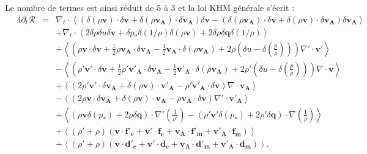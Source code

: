 Le nombre de termes est ainsi réduit de 5 à 3 et la loi \acs{KHM} générale s'écrit : 
\begin{equation}
\boxed{
\begin{array}{lcl}
\label{eq:turb_cpi_khm3}\quad 4\partial_t \mathcal{R} &=& \nabla_{\boldsymbol{\ell}} \cdot \left<\left(\delta \left(\rho\boldsymbol{v}\right) \cdot \delta \boldsymbol{v}+ \delta \left(\rho\boldsymbol{v_A}\right) \cdot \delta \boldsymbol{v_A}\right) \delta \boldsymbol{v}  -\left(\delta \left(\rho\boldsymbol{v_A}\right) \cdot \delta \boldsymbol{v}  + \delta \left(\rho\boldsymbol{v}\right) \cdot \delta \boldsymbol{v_A}  \right) \delta \boldsymbol{v_A} \right>\\
&& + \nabla_{\boldsymbol{\ell}} \cdot \left<2 \delta \rho \delta u \delta \boldsymbol{v}+ \delta p_*  \delta \left(1/\rho\right) \delta\left(\rho \boldsymbol{v}\right) + 2\delta \rho \delta \boldsymbol{q}\delta \left(1/\rho\right) \right> \\
&& +\left< \left(\rho \boldsymbol{v} \cdot \delta \boldsymbol{v} +\frac{1}{2} \rho \boldsymbol{v_A} \cdot \delta \boldsymbol{v_A} -\frac{1}{2} \boldsymbol{v_A} \cdot \delta \left(\rho \boldsymbol{v_A}\right) + 2\rho \left(\delta u - \delta \left(\frac{p}{\rho}\right)\right) \right) \nabla' \cdot \boldsymbol{v'} \right>\\
&& -\left<\left( \rho' \boldsymbol{v'} \cdot \delta \boldsymbol{v} +\frac{1}{2} \rho' \boldsymbol{v'_A} \cdot \delta \boldsymbol{v_A} -\frac{1}{2} \boldsymbol{v'_A} \cdot \delta \left(\rho \boldsymbol{v_A}\right) + 2\rho' \left(\delta u - \delta \left(\frac{p}{\rho}\right)\right)  \right)\nabla \cdot \boldsymbol{v}\right>\\
&&+ \left<\left(2 \rho' \boldsymbol{v'} \cdot \delta \boldsymbol{v_A}+ \delta\left(\rho \boldsymbol{v}\right) \cdot \boldsymbol{v'_A} - \rho' \boldsymbol{v'_A} \cdot \delta \boldsymbol{v}  \right)\nabla \cdot \boldsymbol{v_A}\right>\\
&&- \left<\left(2\rho \boldsymbol{v} \cdot \delta \boldsymbol{v_A} + \delta\left(\rho \boldsymbol{v}\right) \cdot \boldsymbol{v_A} - \rho \boldsymbol{v_A} \cdot \delta \boldsymbol{v}  \right)\nabla' \cdot \boldsymbol{v'_A}\right> \\
&&+ \left< \left(\rho\boldsymbol{v} \delta \left(p_*\right)  + 2 \rho \delta \boldsymbol{q}\right) \cdot \nabla'\left(\frac{1}{\rho'}\right) - \left(\rho' \boldsymbol{v'}\delta \left(p_*\right) + 2\rho' \delta \boldsymbol{q} \right) \cdot \nabla \left(\frac{1}{\rho}\right)\right>\\
&&+  \left<\left(\rho' + \rho\right)\left(\boldsymbol{v} \cdot \boldsymbol{f'_c} + \boldsymbol{v'} \cdot \boldsymbol{f_c} + \boldsymbol{v_A} \cdot \boldsymbol{f'_m} + \boldsymbol{v'_A} \cdot \boldsymbol{f_m}\right) \right>\\
&&+ \left<\left(\rho' + \rho\right)\left(\boldsymbol{v} \cdot \boldsymbol{d'_c} + \boldsymbol{v'} \cdot \boldsymbol{d_c}+\boldsymbol{v_A} \cdot \boldsymbol{d'_m} + \boldsymbol{v'_A} \cdot \boldsymbol{d_m}\right)\right> .
\end{array}}
\end{equation}
